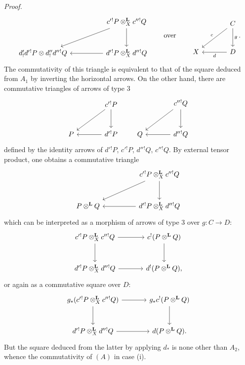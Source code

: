\documentclass[11pt]{article}
\newenvironment{prooftext}[1][Proof]{\par\noindent\emph{#1.}\ }{\par\medskip}
\begin{document}
\begin{prooftext}[Proof]
\[\begin{tikzcd}[column sep=huge,row sep=large]
& c'{}^!P\otimes_X^{\mathbf L}c''{}^!Q \arrow[d] \arrow[dl]\\
d'_!d'{}^!P\otimes d''_!d''{}^!Q &
d'{}^!P\otimes_X^{\mathbf L}d''{}^!Q\arrow[l]
\end{tikzcd}
\qquad\text{over}\qquad
\begin{tikzcd}[column sep=large,row sep=large]
& C\arrow[d,"g"]\arrow[dl,"c"']\\
X & D\arrow[l,"d"]
\end{tikzcd}.
\]
The commutativity of this triangle is equivalent to that of the square deduced from $A_1$ by inverting the horizontal arrows. On the other hand, there are commutative triangles of arrows of type $3$
\[
\begin{tikzcd}[column sep=large,row sep=large]
& c'{}^!P \arrow[d]\arrow[dl]\\
P & d'{}^!P\arrow[l]
\end{tikzcd}
\qquad
\begin{tikzcd}[column sep=large,row sep=large]
& c''{}^!Q \arrow[d]\arrow[dl]\\
Q & d''{}^!Q\arrow[l]
\end{tikzcd}
\]
defined by the identity arrows of $d'{}^!P$, $c'{}^!P$, $d''{}^!Q$, $c''{}^!Q$. By external tensor product, one obtains a commutative triangle
\[
\begin{tikzcd}[column sep=huge,row sep=large]
& c'{}^!P\otimes_X^{\mathbf L}c''{}^!Q \arrow[d]\arrow[dl]\\
P\otimes^{\mathbf L}Q & d'{}^!P\otimes_X^{\mathbf L}d''{}^!Q\arrow[l]
\end{tikzcd}
\]
which can be interpreted as a morphism of arrows of type $3$ over $g:C\longrightarrow D$:
\[
\begin{tikzcd}[column sep=large,row sep=large]
c'{}^!P\otimes_X^{\mathbf L}c''{}^!Q \arrow[r]\arrow[d] &
c^!(P\otimes^{\mathbf L}Q)\arrow[d]\\
d'{}^!P\otimes_X^{\mathbf L}d''{}^!Q \arrow[r] &
d^!(P\otimes^{\mathbf L}Q),
\end{tikzcd}
\]
or again as a commutative square over $D$:
\[
\begin{tikzcd}[column sep=large,row sep=large]
g_*(c'{}^!P\otimes_X^{\mathbf L}c''{}^!Q) \arrow[r]\arrow[d] &
g_*c^!(P\otimes^{\mathbf L}Q)\arrow[d]\\
d'{}^!P\otimes_X^{\mathbf L}d''{}^!Q \arrow[r] &
d(P\otimes^{\mathbf L}Q).
\end{tikzcd}
\]
But the square deduced from the latter by applying $d_*$ is none other than $A_2$, whence the commutativity of $(A)$ in case (i).


\end{prooftext}
\end{document}
